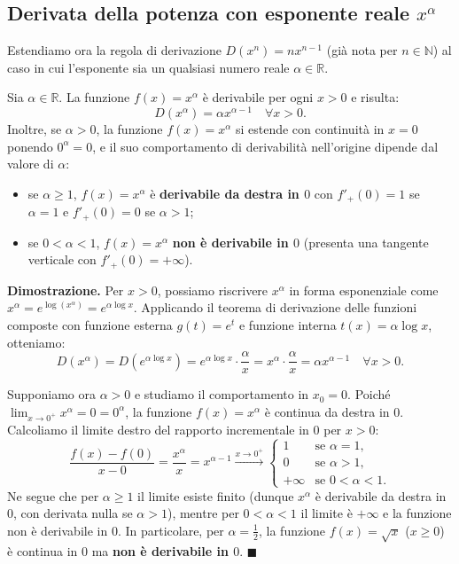 \subsection{Derivata della potenza con esponente reale $x^\alpha$}

Estendiamo ora la regola di derivazione $D(x^n) = n x^{n-1}$ (già nota per $n \in \mathbb{N}$) al caso in cui l'esponente sia un qualsiasi numero reale $\alpha \in \mathbb{R}$.

\begin{propbox}
Sia $\alpha \in \mathbb{R}$. La funzione $f(x) = x^\alpha$ è derivabile per ogni $x > 0$ e risulta:
\[
    D(x^\alpha) = \alpha x^{\alpha - 1} \quad \forall x > 0.
\]
Inoltre, se $\alpha > 0$, la funzione $f(x) = x^\alpha$ si estende con continuità in $x = 0$ ponendo $0^\alpha = 0$, e il suo comportamento di derivabilità nell'origine dipende dal valore di $\alpha$:
\begin{itemize}
    \item se $\alpha \ge 1$, $f(x) = x^\alpha$ è \textbf{derivabile da destra in $0$} con $f'_{+}(0) = 1$ se $\alpha = 1$ e $f'_{+}(0) = 0$ se $\alpha > 1$;
    \item se $0 < \alpha < 1$, $f(x) = x^\alpha$ \textbf{non è derivabile in $0$} (presenta una tangente verticale con $f'_{+}(0) = +\infty$).
\end{itemize}
\end{propbox}

\noindent\textbf{Dimostrazione.}
Per $x > 0$, possiamo riscrivere $x^\alpha$ in forma esponenziale come $x^\alpha = e^{\log(x^\alpha)} = e^{\alpha \log x}$. Applicando il teorema di derivazione delle funzioni composte con funzione esterna $g(t) = e^t$ e funzione interna $t(x) = \alpha \log x$, otteniamo:
\[
    D(x^\alpha) = D\!\left(e^{\alpha \log x}\right) = e^{\alpha \log x} \cdot \frac{\alpha}{x} = x^\alpha \cdot \frac{\alpha}{x} = \alpha x^{\alpha - 1} \quad \forall x > 0.
\]

Supponiamo ora $\alpha > 0$ e studiamo il comportamento in $x_0 = 0$. Poiché $\lim_{x \to 0^+} x^\alpha = 0 = 0^\alpha$, la funzione $f(x) = x^\alpha$ è continua da destra in $0$. Calcoliamo il limite destro del rapporto incrementale in $0$ per $x > 0$:
\[
    \frac{f(x) - f(0)}{x - 0} = \frac{x^\alpha}{x} = x^{\alpha - 1} \xrightarrow{x \to 0^+}
    \begin{cases}
        1 & \text{se } \alpha = 1, \\
        0 & \text{se } \alpha > 1, \\
        +\infty & \text{se } 0 < \alpha < 1.
    \end{cases}
\]
Ne segue che per $\alpha \ge 1$ il limite esiste finito (dunque $x^\alpha$ è derivabile da destra in $0$, con derivata nulla se $\alpha > 1$), mentre per $0 < \alpha < 1$ il limite è $+\infty$ e la funzione non è derivabile in $0$. In particolare, per $\alpha = \frac{1}{2}$, la funzione $f(x) = \sqrt{x}$ ($x \ge 0$) è continua in $0$ ma \textbf{non è derivabile in $0$}. $\blacksquare$

